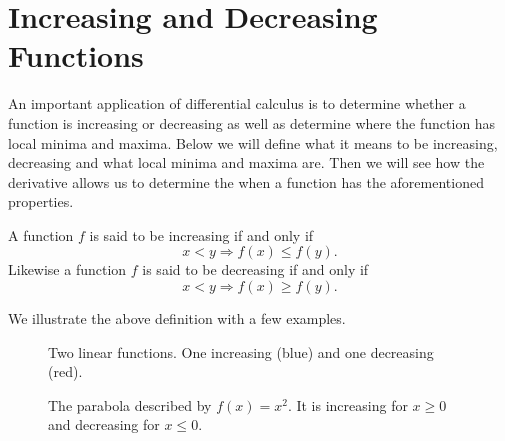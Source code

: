 \documentclass[main.tex]{subfiles}
\begin{document}
\section{Increasing and Decreasing Functions}
An important application of differential calculus is to determine whether a function is increasing or decreasing as well as determine where the function has local minima and maxima. Below we will define what it means to be increasing, decreasing and what local minima and maxima are. Then we will see how the derivative allows us to determine the when a function has the aforementioned properties.

\begin{definition}
A function $f$ is said to be increasing if and only if
\begin{equation}
x < y \Rightarrow f(x) \leq f(y).
\end{equation}
Likewise a function $f$ is said to be decreasing if and only if
\begin{equation}
x < y \Rightarrow f(x) \geq f(y).
\end{equation}
\end{definition}
We illustrate the above definition with a few examples.
\begin{figure}
\begin{center}
\begin{minipage}[t]{0.45\linewidth}
\caption{Two linear functions. One increasing (blue) and one decreasing (red).}
\end{minipage}
\quad
\begin{minipage}[t]{0.45\linewidth}
\caption{The parabola described by $f(x) = x^2$. It is increasing for $x \geq 0$ and decreasing for $x \leq 0$.}
\end{minipage}
\end{center}
\end{figure}
\end{document}
